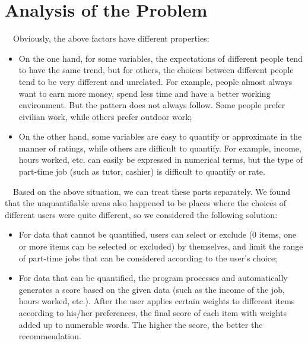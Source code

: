 \documentclass[12pt]{article}
\begin{document}
\section{Analysis of the Problem}
~~Obviously, the above factors have different properties:
\begin{itemize}
    \item On the one hand, for some variables, the expectations of different people tend to have the same trend, but for others, the choices between different people tend to be very different and unrelated. For example, people almost always want to earn more money, spend less time and have a better working environment. But the pattern does not always follow. Some people prefer civilian work, while others prefer outdoor work;
    \item On the other hand, some variables are easy to quantify or approximate in the manner of ratings, while others are difficult to quantify. For example, income, hours worked, etc. can easily be expressed in numerical terms, but the type of part-time job (such as tutor, cashier) is difficult to quantify or rate.
\end{itemize}
~~Based on the above situation, we can treat these parts separately. We found that the unquantifiable areas also happened to be places where the choices of different users were quite different, so we considered the following solution:
~~\begin{itemize}
    \item For data that cannot be quantified, users can select or exclude (0 items, one or more items can be selected or excluded) by themselves, and limit the range of part-time jobs that can be considered according to the user's choice;
    \item For data that can be quantified, the program processes and automatically generates a score based on the given data (such as the income of the job, hours worked, etc.). After the user applies certain weights to different items according to his/her preferences, the final score of each item with weights added up to numerable words. The higher the score, the better the recommendation.
\end{itemize}
\end{document}
